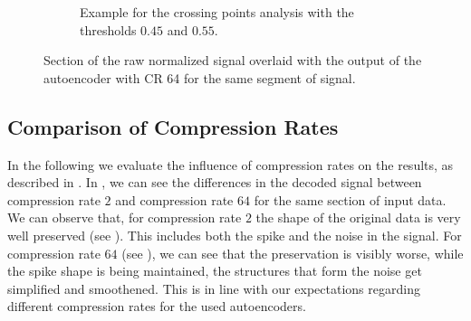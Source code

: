 \begin{figure}[h]
\begin{subfigure}[t]{.49\textwidth}
		\caption{Example for the crossing points analysis with the thresholds $0.45$ and $0.55$.}
		\label{fig:CrossingExample2}
	\end{subfigure}%
	\caption{Section of the raw normalized signal overlaid with the output of the autoencoder with CR 64 for the same segment of signal.}
	\label{fig:CrossingExample}
\end{figure}
\FloatBarrier

\subsection{Comparison of Compression Rates}
In the following we evaluate the influence of compression rates on the results, as described in .
In , we can see the differences in the decoded signal between compression rate $2$ and compression rate $64$ for the same section of input data.
We can observe that, for compression rate $2$ the shape of the original data is very well preserved (see ). This includes both the spike and the noise in the signal.
For compression rate $64$ (see ), we can see that the preservation is visibly worse, while the spike shape is being maintained, the structures that form the noise get simplified and smoothened.
This is in line with our expectations regarding different compression rates for the used autoencoders.

